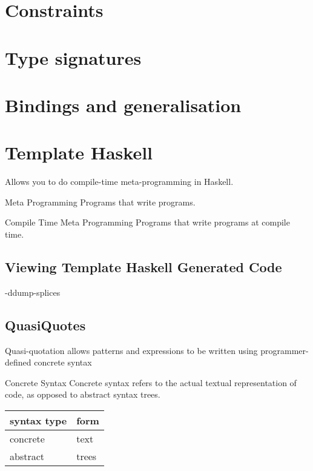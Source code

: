 \documentclass[openany, 12pt]{book}
\begin{document}
\part{Constraints}
\part{Type signatures}
\part{Bindings and generalisation}
\part{Template Haskell}
Allows you to do compile-time meta-programming in Haskell.

\begin{definition}{Meta Programming}{}
	Programs that write programs.
\end{definition}

\begin{definition}{Compile Time Meta Programming}{}
	Programs that write programs at compile time.
\end{definition}

\setcounter{chapter}{2}
\chapter{Viewing Template Haskell Generated Code}
\begin{haskell}{}
-ddump-splices
\end{haskell}

\setcounter{chapter}{6}

\chapter{QuasiQuotes}
Quasi-quotation allows patterns and expressions to be written using
programmer-defined concrete syntax

\begin{definition}{Concrete Syntax}{}
	Concrete syntax refers to the actual textual representation of code, as
	opposed to abstract syntax trees.
	\begin{center}
		\begin{tabular}{ll}
			\toprule
			syntax type & form  \\
			\midrule
			concrete    & text  \\
			abstract    & trees \\
			\bottomrule
		\end{tabular}
	\end{center}
\end{definition}
\end{document}
